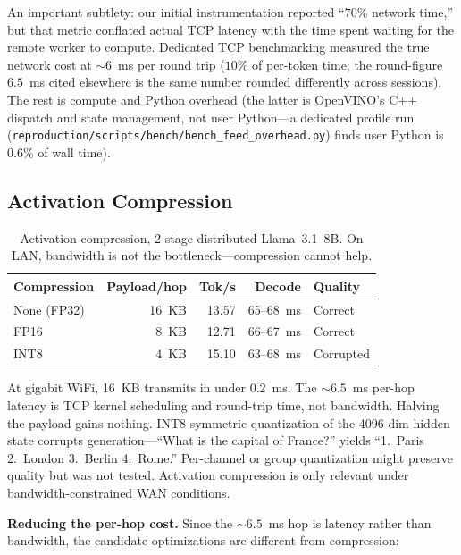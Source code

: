 \documentclass[11pt]{article}
\newcommand{\brk}{\discretionary{}{}{}}
\begin{document}
An important subtlety: our initial instrumentation reported ``70\% network time,'' but that metric conflated actual TCP latency with the time spent waiting for the remote worker to compute. Dedicated TCP benchmarking measured the true network cost at ${\sim}6$~ms per round trip ($10\%$ of per-token time; the round-figure $6.5$~ms cited elsewhere is the same number rounded differently across sessions). The rest is compute and Python overhead (the latter is OpenVINO's C++ dispatch and state management, not user Python---a dedicated profile run (\texttt{reproduction/\brk scripts/\brk bench/\brk bench\_\brk feed\_\brk overhead.py}) finds user Python is $0.6\%$ of wall time).

\subsection{Activation Compression}
\label{sec:compression}

\begin{table}[ht]
\centering
\caption{Activation compression, 2-stage distributed Llama~3.1~8B. On LAN, bandwidth is not the bottleneck---compression cannot help.}
\label{tab:compression}
\begin{tabular}{@{}lrrrl@{}}
\toprule
Compression & Payload/hop & Tok/s & Decode & Quality \\
\midrule
None (FP32) & 16~KB & 13.57 & 65--68~ms & Correct \\
FP16 & 8~KB & 12.71 & 66--67~ms & Correct \\
INT8 & 4~KB & 15.10 & 63--68~ms & Corrupted \\
\bottomrule
\end{tabular}
\end{table}

At gigabit WiFi, 16~KB transmits in under $0.2$~ms. The $\sim 6.5$~ms per-hop latency is TCP kernel scheduling and round-trip time, not bandwidth. Halving the payload gains nothing. INT8 symmetric quantization of the 4096-dim hidden state corrupts generation---``What is the capital of France?'' yields ``1.\ Paris 2.\ London 3.\ Berlin 4.\ Rome.'' Per-channel or group quantization might preserve quality but was not tested. Activation compression is only relevant under bandwidth-constrained WAN conditions.

\textbf{Reducing the per-hop cost.} Since the ${\sim}6.5$~ms hop is latency rather than bandwidth, the candidate optimizations are different from compression:
\end{document}
